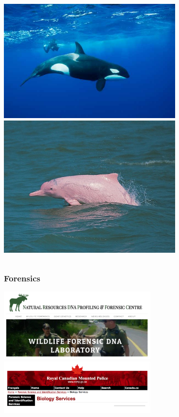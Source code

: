 \documentclass[10pt]{beamer}
\begin{document}
\begin{frame}[t]
\begin{columns}[t]
		\begin{column}{0.5\textwidth}
			\begin{center}
				\includegraphics[width=0.7\textwidth]{figures/orca.jpg}\\
				\vspace{0.25cm}
				\includegraphics[width=0.7\textwidth]{figures/humpback.jpg}
			\end{center}
		\end{column}	
	\end{columns}	
\end{frame}


\begin{frame}[t]
\frametitle{Forensics}
\vspace{0.25cm}

	\begin{center}
		\includegraphics[width=0.6\textwidth]{figures/nrdpfc.png}\\
		\vspace{0.5cm}
		\includegraphics[width=0.6\textwidth]{figures/rcmp.png}
	\end{center}
\end{frame}
\end{document}
